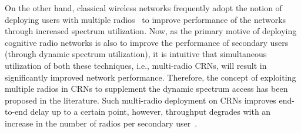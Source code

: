 \documentclass[12pt,addpoints,fleqn]{exam}
\begin{document}
\begin{questions}


On the other hand, classical wireless networks frequently adopt the notion of deploying users with multiple radios~\cite{bahl2004reconsidering, adya2004multi} to improve performance of the networks~\cite{bahl2004reconsidering, draves2004routing, miu2005improving, song2012performance} through increased spectrum utilization. Now, as the primary motive of deploying cognitive radio networks is also to improve the performance of secondary users (through dynamic spectrum utilization), it is intuitive that simultaneous utilization of both these techniques, i.e., multi-radio CRNs, will result in significantly improved network performance. Therefore, the concept of exploiting multiple radios in CRNs to supplement the dynamic spectrum access has been proposed in the literature. Such multi-radio deployment on CRNs improves end-to-end delay up to a certain point, however, throughput degrades with an increase in the number of radios per secondary user~\cite{khan2015towards}.


\end{questions}
\end{document}
